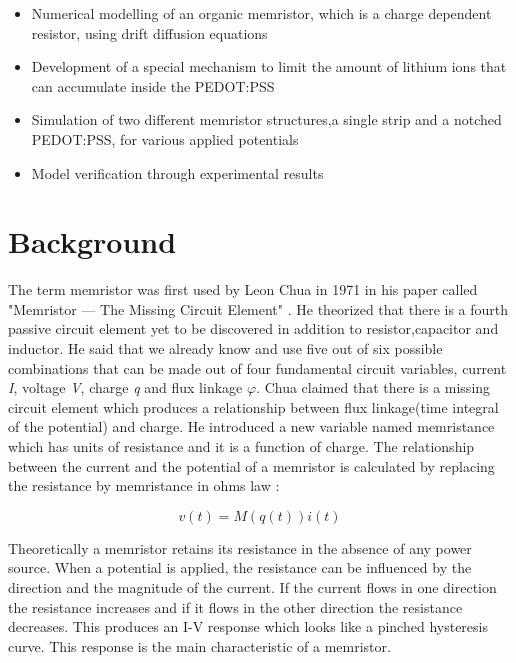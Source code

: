 \begin{doublespace}
\begin{itemize}
  \item Numerical modelling of an organic memristor, which is a charge dependent resistor, using drift diffusion equations  
  \item Development of a special mechanism to limit the amount of lithium ions that can accumulate inside the PEDOT:PSS
  \item Simulation of two different memristor structures,a single strip and a notched PEDOT:PSS, for various applied potentials
  \item Model verification through experimental results 
\end{itemize}

\section{Background}
The term memristor was first used by Leon Chua in 1971 in his paper called  "Memristor — The Missing Circuit Element" \cite{chua}. He theorized that there is a fourth passive circuit element yet to be discovered in addition to resistor,capacitor and inductor. He said that we already know and use five out of six possible combinations that can be made out of four fundamental circuit variables, current \textit{I}, voltage \textit{V}, charge \textit{q} and flux linkage \textit{$\varphi$}. Chua claimed that there is a missing circuit element which produces a relationship between flux linkage(time integral of the potential) and charge. He introduced a new variable named memristance which has units of resistance and it is a function of charge. The relationship between the current and the potential of a memristor is calculated by replacing the resistance by memristance in ohms law \cite{memristance}:


\begin{equation}
v(t)=M(q(t))i(t)
\end{equation}

Theoretically a memristor retains its resistance in the absence of any power source. When a potential is applied, the resistance can be influenced by the direction and the magnitude of the current. If the current flows in one direction the resistance increases and if it flows in the other direction the resistance decreases. This produces an I-V response which looks like a pinched hysteresis curve. This response is the main characteristic of a memristor. 


\end{doublespace}
